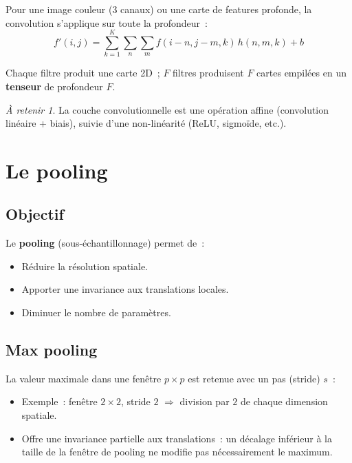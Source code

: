 \documentclass[a4paper,11pt]{article}
\theoremstyle{definition}
\theoremstyle{remark}
\newtheorem*{important}{\`A retenir}
\begin{document}
Pour une image couleur (3 canaux) ou une carte de features
profonde, la convolution s'applique sur toute la profondeur~:
\begin{equation}
  f'(i,j) = \sum_{k=1}^{K} \sum_{n}\sum_{m}
  f(i-n, j-m, k)\,h(n,m,k) + b
\end{equation}

\noindent Chaque filtre produit une carte 2D~; $F$ filtres
produisent $F$ cartes empil\'ees en un \textbf{tenseur} de
profondeur $F$.

\begin{important}
  La couche convolutionnelle est une op\'eration affine
  (convolution lin\'eaire + biais), suivie d'une non-lin\'earit\'e
  (ReLU, sigmo\"ide, etc.).
\end{important}

\section{Le pooling}

\subsection{Objectif}

Le \textbf{pooling} (sous-\'echantillonnage) permet de~:
\begin{itemize}
  \item R\'eduire la r\'esolution spatiale.
  \item Apporter une invariance aux translations locales.
  \item Diminuer le nombre de param\`etres.
\end{itemize}

\subsection{Max pooling}

La valeur maximale dans une fen\^etre $p \times p$ est retenue avec
un pas (stride) $s$~:
\begin{itemize}
  \item Exemple~: fen\^etre $2\times 2$, stride $2$ $\Rightarrow$
    division par $2$ de chaque dimension spatiale.
  \item Offre une invariance partielle aux translations~: un
    d\'ecalage inf\'erieur \`a la taille de la fen\^etre de pooling
    ne modifie pas n\'ecessairement le maximum.
\end{itemize}
\end{document}
